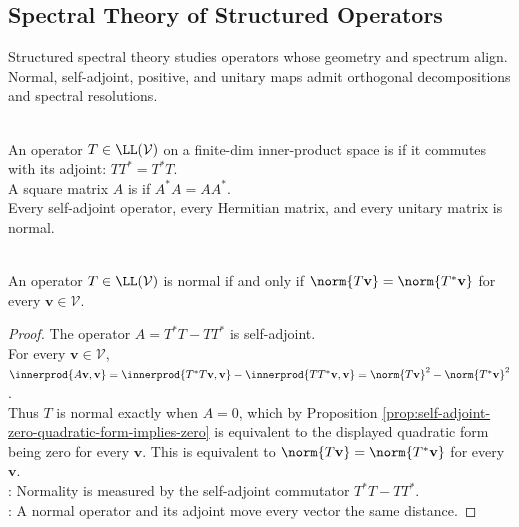 \subsection{Spectral Theory of Structured Operators}


%

Structured spectral theory studies operators whose geometry and spectrum align. Normal, self-adjoint, positive, and unitary maps admit orthogonal decompositions and spectral resolutions.

\begin{definition} \label{def:normal-operator} \\
An operator $T\in\LL(\mathcal{V})$ on a finite-dim inner-product space is  if it commutes with its adjoint: $TT^*=T^*T$.\\
A square matrix $A$ is  if $A^*A=AA^*$.\\
Every self-adjoint operator, every Hermitian matrix, and every unitary matrix is normal.
\end{definition}

\begin{theorem} \label{thm:normal-iff-equal-adjoint-norms} \\
An operator $T\in\LL(\mathcal{V})$ is normal if and only if $\norm{T\mathbf{v}}=\norm{T^*\mathbf{v}}$ for every $\mathbf{v}\in\mathcal{V}$.
\begin{proof}
The operator $A=T^*T-TT^*$ is self-adjoint.\\
For every $\mathbf{v}\in\mathcal{V}$, $\innerprod{A\mathbf{v},\mathbf{v}} =\innerprod{T^*T\mathbf{v},\mathbf{v}}-\innerprod{TT^*\mathbf{v},\mathbf{v}} =\norm{T\mathbf{v}}^2-\norm{T^*\mathbf{v}}^2$.\\
Thus $T$ is normal exactly when $A=0$, which by Proposition \ref{prop:self-adjoint-zero-quadratic-form-implies-zero} is equivalent to the displayed quadratic form being zero for every $\mathbf{v}$. This is equivalent to $\norm{T\mathbf{v}}=\norm{T^*\mathbf{v}}$ for every $\mathbf{v}$.\\
: Normality is measured by the self-adjoint commutator $T^*T-TT^*$.\\
: A normal operator and its adjoint move every vector the same distance.
\end{proof}
\end{theorem}

